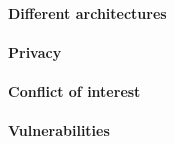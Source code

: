 \paragraph{Different architectures}

\paragraph{Privacy}

\paragraph{Conflict of interest}

\paragraph{Vulnerabilities}
